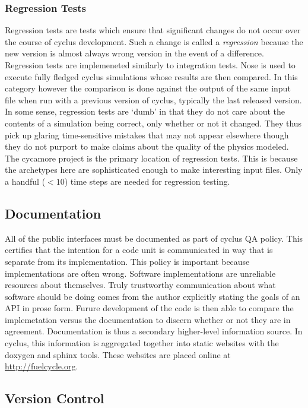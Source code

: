 \subsubsection{Regression Tests}

Regression tests are tests which ensure that significant changes do not 
occur over the course of cyclus development. Such a change is called a 
\emph{regression} because the new version is almost always wrong version in the 
event of a difference.
Regression tests are implemeneted similarly to integration tests.
Nose is used to execute fully fledged cyclus simulations whose results
are then compared. In this category however the comparison is done against 
the output of the same input file when run with a previous version of cyclus, 
typically the last released version.
In some sense, regression tests are `dumb' in that they do 
not care about the contents of a simulation being correct, only whether or not 
it changed. They thus pick up glaring time-sensitive mistakes that may 
not appear elsewhere though they do not purport to make claims about the
quality of the physics modeled. The cycamore project is the primary location of
regression tests. This is because the archetypes here are sophisticated enough
to make interesting input files. Only a handful ($<10$) time steps are needed 
for regression testing.

\subsection{Documentation}

All of the public interfaces must be documented as part of cyclus
QA policy. This certifies that the intention for a code unit is communicated 
in way that is separate from its implementation. This policy is important 
because implementations are often wrong. Software implementations are unreliable 
resources about themselves. Truly trustworthy communication about what 
software should be doing comes from the author explicitly stating the 
goals of an API in prose form. Furure development of the code is then able to 
compare the implemetation versus the documentation to discern whether or not they 
are in agreement. Documentation is thus a secondary higher-level information 
source.  In cyclus, this information is aggregated together into static 
websites with the doxygen \cite{van_heesch_doxygen:_2008} and sphinx 
\cite{brandl_sphinx_2014} 
tools. These websites are placed online at \url{http://fuelcycle.org}.

\subsection{Version Control}

